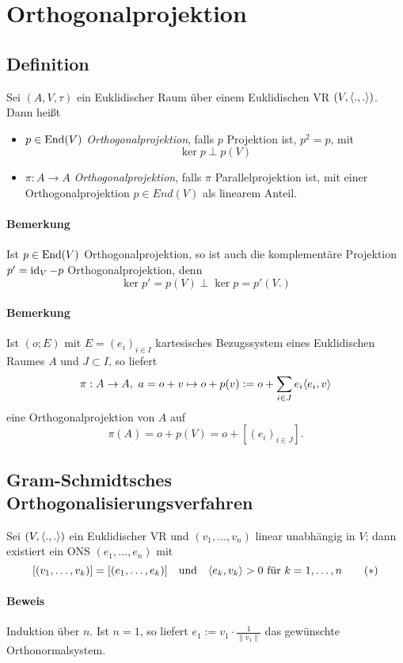 \section{Orthogonalprojektion}
\subsection{Definition}
\begin{Definition}[Orthogonalprojektion]
	Sei $ (A,V,\tau) $ ein Euklidischer Raum über einem Euklidischen VR $ (V, \langle .,. \rangle) $. Dann heißt
		\begin{itemize}
			\item $ p\in \operatorname{End}(V) $ \emph{Orthogonalprojektion}, falls $ p $ Projektion ist, $ p^2 = p $, mit
				\[ \ker p \perp p(V) \]
			\item $ \pi: A\to A $ \emph{Orthogonalprojektion}, falls $ \pi $ Parallelprojektion ist, mit einer Orthogonalprojektion $ p\in End(V) $ als linearem Anteil.
		\end{itemize}
\end{Definition}
\paragraph{Bemerkung}
	Ist $ p\in \operatorname{End}(V) $ Orthogonalprojektion, so ist auch die komplementäre Projektion $ p' = \operatorname{id}_V-p $ Orthogonalprojektion, denn
		\[ \ker p' = p(V)\perp \ker p = p'(V.) \]
\paragraph{Bemerkung}
	Ist $ (o;E) $ mit $ E=(e_i)_{i\in I} $ kartesisches Bezugssystem eines Euklidischen Raumes $ A $ und $ J\subset I $, so liefert
		\[ \pi: A\to A,\ a = o+v \mapsto o+p(v) := o+\sum_{i\in J}e_i\langle e_i,v \rangle \]
	eine Orthogonalprojektion von $ A $ auf
		\[ \pi(A) = o + p(V) = o + [(e_i)_{i\in J}]. \]

\subsection{Gram-Schmidtsches Orthogonalisierungsverfahren}
	Sei $ (V,\langle .,. \rangle) $ ein Euklidischer VR und $ (v_1,\dots,v_n) $ linear unabhängig in $ V $; dann existiert ein ONS $ (e_1,\dots,e_n) $ mit
		\[ [(v_1,\dots,v_k)] = [(e_1,\dots,e_k)] \quad\text{und}\quad \langle e_k,v_k \rangle > 0 \text{ für } k = 1,\dots,n \tag{$ * $} \]
\paragraph{Beweis}
	Induktion über $ n $. Ist $ n=1 $, so liefert $ e_1 := v_1\cdot\frac{1}{\|v_1\|} $ das gewünschte Orthonormalsystem. 
	
